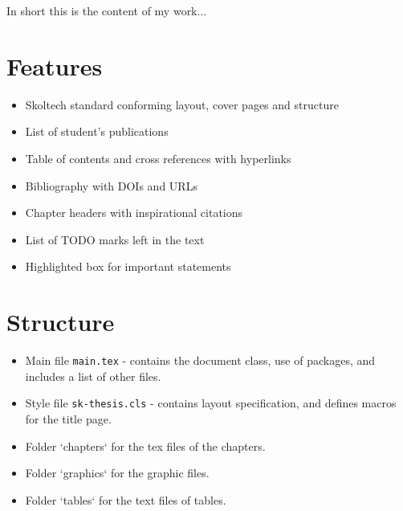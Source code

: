 In short this is the content of my work...

\section{Features}

\begin{itemize}
    \item Skoltech standard conforming layout, cover pages and structure
    \item List of student's publications
    \item Table of contents and cross references with hyperlinks
    \item Bibliography with DOIs and URLs
    \item Chapter headers with inspirational citations
    \item List of TODO marks left in the text
    \item Highlighted box for important statements
\end{itemize}

\section{Structure}

\begin{itemize}
    \item Main file \texttt{main.tex} - contains the document class, use of packages, and includes a list of other files.
    \item Style file \texttt{sk-thesis.cls} - contains layout specification, and defines macros for the title page.
    \item Folder `chapters` for the tex files of the chapters.
    \item Folder `graphics` for the graphic files.
    \item Folder `tables` for the text files of tables.
\end{itemize}
